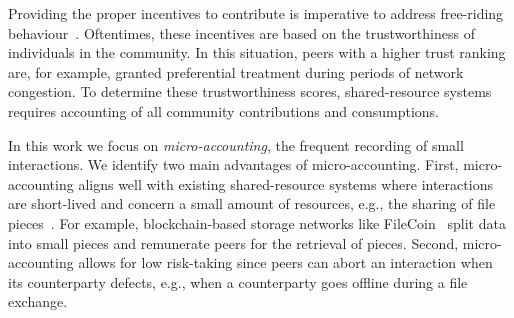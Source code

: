 
Providing the proper incentives to contribute is imperative to address free-riding behaviour~\cite{ma2004incentive}.
Oftentimes, these incentives are based on the trustworthiness of individuals in the community.
In this situation, peers with a higher trust ranking are, for example, granted preferential treatment during periods of network congestion.
To determine these trustworthiness scores, shared-resource systems requires accounting of all community contributions and consumptions.

In this work we focus on \emph{micro-accounting}, the frequent recording of small interactions.
We identify two main advantages of micro-accounting.
First, micro-accounting aligns well with existing shared-resource systems where interactions are short-lived and concern a small amount of resources, e.g., the sharing of file pieces~\cite{seuken2014work}.
For example, blockchain-based storage networks like FileCoin~\cite{benet2018filecoin} split data into small pieces and remunerate peers for the retrieval of pieces.
Second, micro-accounting allows for low risk-taking since peers can abort an interaction when its counterparty defects, e.g., when a counterparty goes offline during a file exchange.






